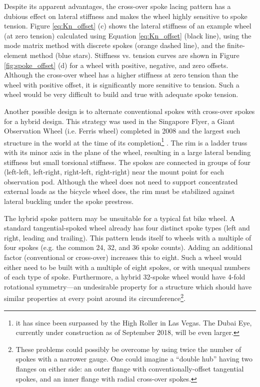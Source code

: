 \documentclass[\rootdir/thesis.tex]{subfiles}
\begin{document}
Despite its apparent advantages, the cross-over spoke lacing pattern has a dubious effect on lateral stiffness and makes the wheel highly sensitive to spoke tension. Figure \ref{eq:Kn_offset} (c) shows the lateral stiffness of an example wheel  (at zero tension) calculated using Equation \eqref{eq:Kn_offset} (black line), using the mode matrix method with discrete spokes (orange dashed line), and the finite-element method (blue stars). Stiffness vs. tension curves are shown in Figure \ref{fig:spoke_offset} (d) for a wheel with positive, negative, and zero offsets. Although the cross-over wheel has a higher stiffness at zero tension than the wheel with positive offset, it is significantly more sensitive to tension. Such a wheel would be very difficult to build and true with adequate spoke tension.

Another possible design is to alternate conventional spokes with cross-over spokes for a hybrid design. This strategy was used in the Singapore Flyer, a Giant Observation Wheel (i.e. Ferris wheel) completed in 2008 and the largest such structure in the world at the time of its completion\footnote{it has since been surpassed by the High Roller in Las Vegas. The Dubai Eye, currently under construction as of September 2018, will be even larger.} \cite{Allsop2009}. The rim is a ladder truss with its minor axis in the plane of the wheel, resulting in a large lateral bending stiffness but small torsional stiffness. The spokes are connected in groups of four (left-left, left-right, right-left, right-right) near the mount point for each observation pod. Although the wheel does not need to support concentrated external loads as the bicycle wheel does, the rim must be stabilized against lateral buckling under the spoke prestress.

The hybrid spoke pattern may be unsuitable for a typical fat bike wheel. A standard tangential-spoked wheel already has four distinct spoke types (left and right, leading and trailing). This pattern lends itself to wheels with a multiple of four spokes (e.g. the common 24, 32, and 36 spoke counts). Adding an additional factor (conventional or cross-over) increases this to eight. Such a wheel would either need to be built with a multiple of eight spokes, or with unequal numbers of each type of spoke. Furthermore, a hybrid 32-spoke wheel would have 4-fold rotational symmetry---an undesirable property for a structure which should have similar properties at every point around its circumference\footnote{These problems could possibly be overcome by using twice the number of spokes with a narrower gauge. One could imagine a ``double hub'' having two flanges on either side: an outer flange with conventionally-offset tangential spokes, and an inner flange with radial cross-over spokes.}.
\end{document}
